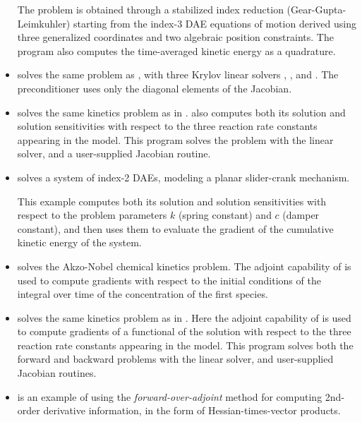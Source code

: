 \begin{itemize}
  The problem is obtained through a stabilized index reduction (Gear-Gupta-Leimkuhler)
  starting from the index-3 DAE equations of motion derived using three generalized
  coordinates and two algebraic position constraints.
  The program also computes the time-averaged kinetic energy as a quadrature.

\item {}
  solves the same problem as , with three Krylov linear solvers
  {\idaspgmr}, {\idaspbcg}, and {\idasptfqmr}.  The preconditioner uses only
  the diagonal elements of the Jacobian.


\item {}
  solves the same kinetics problem as in .
  \newline
  {\idas} also computes both its solution and solution sensitivities with respect
  to the three reaction rate constants appearing in the model. 
  This program solves the problem with the {\idadense} linear solver, and a 
  user-supplied Jacobian routine.

\item {}
  solves a system of index-2 DAEs, modeling a planar slider-crank mechanism.

  This example computes both its solution and solution sensitivities with respect
  to the problem parameters $k$ (spring constant) and $c$ (damper constant), 
  and then uses them to evaluate the gradient of the cumulative kinetic energy
  of the system.


\item {}
  solves the Akzo-Nobel chemical kinetics problem.
  \newline
  The adjoint capability of {\idas} is used to compute gradients with
  respect to the initial conditions of the integral over time of the 
  concentration of the first species.

\item {}
  solves the same kinetics problem as in .
  \newline
  Here the adjoint capability of {\idas} is used to compute gradients
  of a functional of the solution with respect to the three
  reaction rate constants appearing in the model.
  This program solves both the forward and backward problems with the 
  {\idadense} linear solver, and user-supplied Jacobian routines.


\item {}
  is an example of using the {\em forward-over-adjoint} method for
  computing 2nd-order derivative information, in the form of Hessian-times-vector
  products.

\end{itemize}

